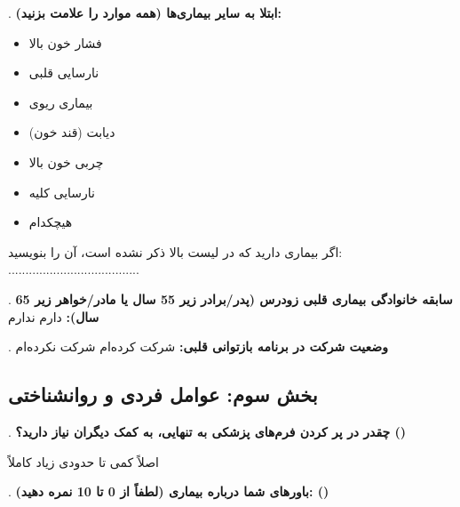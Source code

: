 . \textbf{ابتلا به سایر بیماری‌ها (همه موارد را علامت بزنید):}
\begin{itemize}[label={}]
  \item \checkbox{} فشار خون بالا
  \item \checkbox{} نارسایی قلبی
  \item \checkbox{} بیماری ریوی
  \item \checkbox{} دیابت (قند خون)
  \item \checkbox{} چربی خون بالا
  \item \checkbox{} نارسایی کلیه
  \item \checkbox{} هیچکدام
\end{itemize}

\noindent اگر بیماری دارید که در لیست بالا ذکر نشده است، آن را بنویسید: ......................................

. \textbf{سابقه خانوادگی بیماری قلبی زودرس (پدر/برادر زیر 55 سال یا مادر/خواهر زیر 65 سال):} \checkbox{} دارم \quad \checkbox{} ندارم

. \textbf{وضعیت شرکت در برنامه بازتوانی قلبی:} \checkbox{} شرکت کرده‌ام \quad \checkbox{} شرکت نکرده‌ام

\subsection*{بخش سوم: عوامل فردی و روانشناختی}

. \textbf{چقدر در پر کردن فرم‌های پزشکی به تنهایی، به کمک دیگران نیاز دارید؟ ()}

\noindent \checkbox{} اصلاً \quad \checkbox{} کمی \quad \checkbox{} تا حدودی \quad \checkbox{} زیاد \quad \checkbox{} کاملاً

. \textbf{باورهای شما درباره بیماری (لطفاً از 0 تا 10 نمره دهید): ()}

